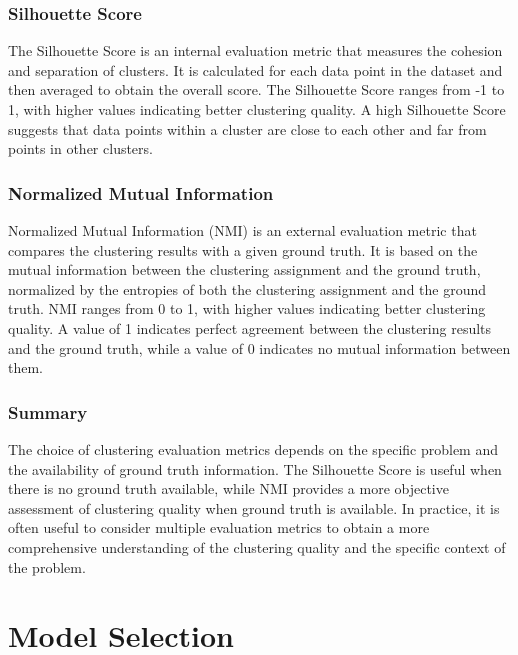 \documentclass[12pt]{article}
\begin{document}

\subsubsection{Silhouette Score}

The Silhouette Score is an internal evaluation metric that measures the cohesion and separation of clusters. It is calculated for each data point in the dataset and then averaged to obtain the overall score. The Silhouette Score ranges from -1 to 1, with higher values indicating better clustering quality. A high Silhouette Score suggests that data points within a cluster are close to each other and far from points in other clusters.

\subsubsection{Normalized Mutual Information}

Normalized Mutual Information (NMI) is an external evaluation metric that compares the clustering results with a given ground truth. It is based on the mutual information between the clustering assignment and the ground truth, normalized by the entropies of both the clustering assignment and the ground truth. NMI ranges from 0 to 1, with higher values indicating better clustering quality. A value of 1 indicates perfect agreement between the clustering results and the ground truth, while a value of 0 indicates no mutual information between them.

\subsubsection{Summary}

The choice of clustering evaluation metrics depends on the specific problem and the availability of ground truth information. The Silhouette Score is useful when there is no ground truth available, while NMI provides a more objective assessment of clustering quality when ground truth is available. In practice, it is often useful to consider multiple evaluation metrics to obtain a more comprehensive understanding of the clustering quality and the specific context of the problem.



\section{Model Selection}
\end{document}
